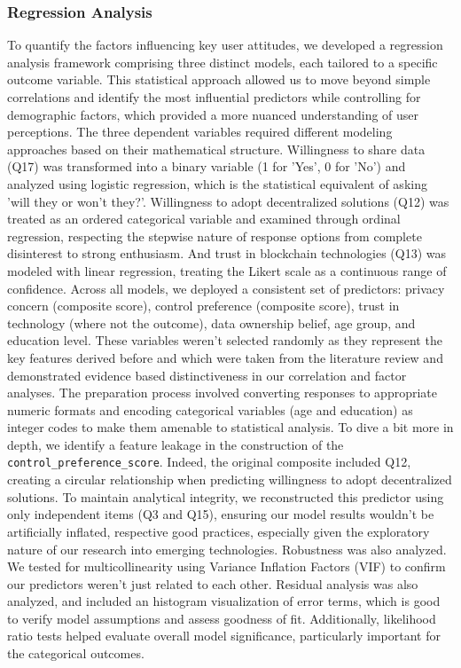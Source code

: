 	\subsubsection{Regression Analysis}
	To quantify the factors influencing key user attitudes, we developed a regression analysis framework comprising three distinct models, each tailored to a specific outcome variable. This statistical approach allowed us to move beyond simple correlations and identify the most influential predictors while controlling for demographic factors, which provided a more nuanced understanding of user perceptions.
	The three dependent variables required different modeling approaches based on their mathematical structure. Willingness to share data (Q17) was transformed into a binary variable (1 for 'Yes', 0 for 'No') and analyzed using logistic regression, which is the statistical equivalent of asking 'will they or won't they?'.
	Willingness to adopt decentralized solutions (Q12) was treated as an ordered categorical variable and examined through ordinal regression, respecting the stepwise nature of response options from complete disinterest to strong enthusiasm. And trust in blockchain technologies (Q13) was modeled with linear regression, treating the Likert scale as a continuous range of confidence.
	Across all models, we deployed a consistent set of predictors: privacy concern (composite score), control preference (composite score), trust in technology (where not the outcome), data ownership belief, age group, and education level. These variables weren't selected randomly as they represent the key features derived before and which were taken from the literature review and demonstrated evidence based distinctiveness in our correlation and factor analyses. The preparation process involved converting responses to appropriate numeric formats and encoding categorical variables (age and education) as integer codes to make them amenable to statistical analysis.
	To dive a bit more in depth, we identify a feature leakage in the construction of the \texttt{control\_preference\_score}. Indeed, the original composite included Q12, creating a circular relationship when predicting willingness to adopt decentralized solutions. To maintain analytical integrity, we reconstructed this predictor using only independent items (Q3 and Q15), ensuring our model results wouldn't be artificially inflated, respective good practices, especially given the exploratory nature of our research into emerging technologies.
	Robustness was also  analyzed. We tested for multicollinearity using Variance Inflation Factors (VIF) to confirm our predictors weren't just related to each other. Residual analysis was also analyzed, and included an histogram visualization of error terms, which is good to verify model assumptions and assess goodness of fit. Additionally, likelihood ratio tests helped evaluate overall model significance, particularly important for the categorical outcomes.
	
